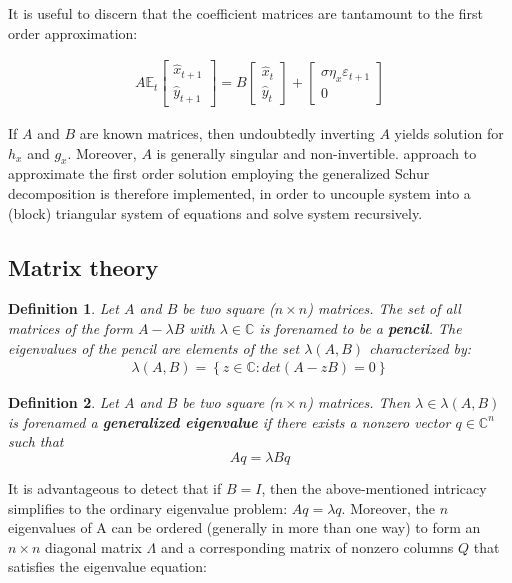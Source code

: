 \documentclass{pracamgr}
\numberwithin{equation}{section}
\newtheorem{mydef}{Definition}
\begin{document}
It is useful to discern that the coefficient matrices are tantamount to the first order approximation:

\begin{eqnarray}
A \mathbb{E}_t\begin{bmatrix} \widehat{x}_{t+1} \\ \widehat{y}_{t+1} \end{bmatrix} = B\begin{bmatrix} \widehat{x}_t\\ \widehat{y}_t \end{bmatrix} + \begin{bmatrix} \sigma \eta_x \varepsilon_{t+1} \\ 0\end{bmatrix}
\end{eqnarray}

If $A$ and $B$ are known matrices, then undoubtedly inverting $A$ yields solution for $h_x$ and $g_x$. Moreover, $A$ is generally singular and non-invertible. \cite{klein2000using} approach to approximate the first order solution employing the generalized Schur decomposition is therefore implemented, in order to uncouple system into a (block) triangular system of equations and solve system recursively.
 
\subsection{Matrix theory}

\begin{mydef}
Let $A$ and $B$ be two square ($n\times n$) matrices. The set of all matrices of the form $A-\lambda B$ with $\lambda \in \mathbb{C}$ is forenamed to be a \textbf{pencil}. The eigenvalues of the pencil are elements of the set $\lambda(A,B)$ characterized by:
  \begin{align*}
    \lambda(A,B) =  \left\{z \in \mathbb{C}:det(A-zB)=0\right\}
  \end{align*}
\end{mydef}

\begin{mydef}
Let $A$ and $B$ be two square ($n\times n$) matrices. Then $\lambda \in \lambda(A,B)$ is forenamed a \textbf{generalized eigenvalue} if there exists a nonzero vector $q\in \mathbb{C}^n$ such that $$A q = \lambda B q$$
\end{mydef}

It is advantageous to detect that if $B=I$, then the above-mentioned intricacy simplifies to the ordinary eigenvalue problem: $A q = \lambda q$. Moreover, the $n$ eigenvalues of A can be ordered (generally in more than one way) to form an $n\times n$ diagonal matrix $\Lambda$ and a corresponding matrix of nonzero columns $Q$ that satisfies the eigenvalue equation:
\end{document}
